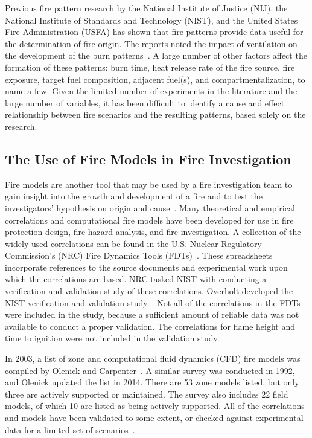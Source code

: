 \documentclass[twoside]{uocthesis}
\begin{document}
Previous fire pattern research by the National Institute of Justice (NIJ), the National Institute of Standards and Technology (NIST), and the United States Fire Administration (USFA) has shown that fire patterns provide data useful for the determination of fire origin.  The reports noted the impact of ventilation on the development of the burn patterns~\cite{Shanley:1997,Putorti:1997}. A large number of other factors affect the formation of these patterns: burn time, heat release rate of the fire source, fire exposure, target fuel composition, adjacent fuel(s), and compartmentalization, to name a few. Given the limited number of experiments in the literature and the large number of variables, it has been difficult to identify a cause and effect relationship between fire scenarios and the resulting patterns, based solely on the research.  


\subsection{The Use of Fire Models in Fire Investigation}
Fire models are another tool that may be used by a fire investigation team to gain insight into the growth and development of a fire and to test the investigators' hypothesis on origin and cause~\cite{Sutula:2001}.  Many theoretical and empirical correlations and computational fire models have been developed for use in fire protection design, fire hazard analysis, and fire investigation.  A collection of the widely used correlations can be found in the U.S. Nuclear Regulatory Commission’s (NRC) Fire Dynamics Tools (FDTs)~\cite{NUREG_1805}. These spreadsheets incorporate references to the source documents and experimental work upon which the correlations are based. NRC tasked NIST with conducting a verification and validation study of these correlations. Overholt developed the NIST verification and validation study~\cite{Overholt:2014}. Not all of the correlations in the FDTs were included in the study, because a sufficient amount of reliable data was not available to conduct a proper validation.  The correlations for flame height and time to ignition were not included in the validation study.

In 2003, a list of zone and computational fluid dynamics (CFD) fire models was compiled by Olenick and Carpenter~\cite{Olenick:2003}. A similar survey was conducted in 1992, and Olenick updated the list in 2014. There are 53 zone models listed, but only three are actively supported or maintained.  The survey also includes 22 field models, of which 10 are listed as being actively supported.  All of the correlations and models have been validated to some extent, or checked against experimental data for a limited set of scenarios~\cite{ASTM_E1355}.
\end{document}
